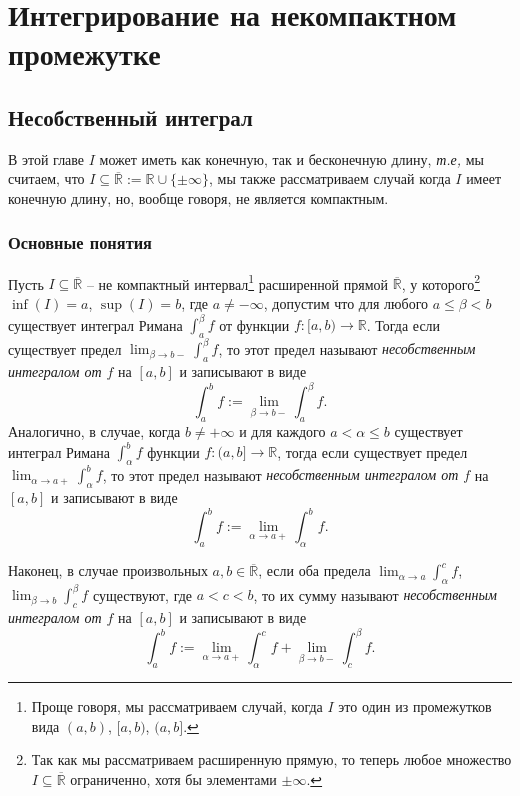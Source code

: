 \chapter{Интегрирование на некомпактном промежутке}

\section{Несобственный интеграл}


В этой главе $I$ может иметь как конечную, так и бесконечную длину, \textit{т.е,} мы считаем, что $I \subseteq \overline{\mathbb{R}}:=\mathbb{R}\cup \{\pm \infty\}$, мы также рассматриваем случай когда $I$ имеет конечную длину, но, вообще говоря, не является компактным.


\subsection{Основные понятия}



\begin{definition}\label{inproper_int}
    Пусть $I \subseteq \overline{\mathbb{R}}$ -- не компактный интервал\footnote{Проще говоря, мы рассматриваем случай, когда $I$ это один из промежутков вида $(a,b)$, $[a,b)$, $(a,b]$.} расширенной прямой $\overline{\mathbb{R}}$, у которого\footnote{Так как мы рассматриваем расширенную прямую, то теперь любое множество $I \subseteq \overline{\mathbb{R}}$ ограниченно, хотя бы элементами $\pm \infty$.} $\inf (I) = a$, $\sup (I)=  b$, где $a \ne - \infty$, допустим что для любого $a\le \beta <b$ существует интеграл Римана $\int_a^\beta f$ от функции $f:[a,b) \to \mathbb{R}$. Тогда если существует предел $\lim_{\beta \to b-}\int_a^\beta f$, то этот предел называют \textit{несобственным интегралом от $f$} на $[a,b]$ и записывают в виде
    \[
     \int_a^b f := \lim_{\beta \to b -} \int_a^\beta f.
    \]
    Аналогично, в случае, когда $b \ne +\infty$ и для каждого $a<\alpha \le b$ существует интеграл Римана $\int_\alpha^b f$ функции $f:(a,b] \to \mathbb{R}$, тогда если существует предел $\lim_{\alpha \to a+} \int_\alpha^b f$, то этот предел называют \textit{несобственным интегралом от $f$} на $[a,b]$ и записывают в виде
    \[
     \int_a^b f := \lim_{\alpha \to a+} \int_\alpha^b f.
    \]

    Наконец, в случае произвольных $a,b \in \overline{\mathbb{R}}$, если оба предела $\lim_{\alpha \to a}\int_\alpha^c f$, $\lim_{\beta \to b}\int_c^\beta f$ существуют, где $a < c <b$, то их сумму называют \textit{несобственным интегралом от $f$} на $[a,b]$ и записывают в виде
    \[
     \int_a^b f := \lim_{\alpha \to a+} \int_\alpha^cf + \lim_{\beta \to b-} \int_c^\beta f.
    \]
\end{definition}

